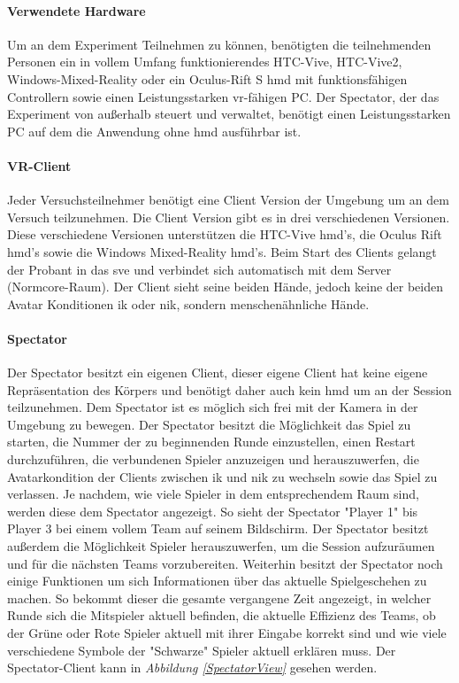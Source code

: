 \documentclass[a4paper,11pt]{article}%
\renewcommand{\\}{\vspace*{0.5\baselineskip} \newline}
\begin{document}
\paragraph{Verwendete Hardware}
Um an dem Experiment Teilnehmen zu können, benötigten die teilnehmenden Personen ein in vollem Umfang funktionierendes HTC-Vive, HTC-Vive2, Windows-Mixed-Reality oder ein Oculus-Rift S \ac{hmd} mit funktionsfähigen Controllern sowie einen Leistungsstarken \ac{vr}-fähigen PC. Der Spectator, der das Experiment von außerhalb steuert und verwaltet, benötigt einen Leistungsstarken PC auf dem die Anwendung ohne \ac{hmd} ausführbar ist.

\paragraph{VR-Client}
Jeder Versuchsteilnehmer benötigt eine Client Version der Umgebung um an dem Versuch teilzunehmen. Die Client Version gibt es in drei verschiedenen Versionen. Diese verschiedene Versionen unterstützen die HTC-Vive \ac{hmd}'s, die Oculus Rift \ac{hmd}'s sowie die Windows Mixed-Reality \ac{hmd}'s. Beim Start des Clients gelangt der Probant in das \ac{sve} und verbindet sich automatisch mit dem Server (Normcore-Raum).
Der Client sieht seine beiden Hände, jedoch keine der beiden Avatar Konditionen \ac{ik} oder \ac{nik}, sondern menschenähnliche Hände.

\paragraph{Spectator}
Der Spectator besitzt ein eigenen Client, dieser eigene Client hat keine eigene Repräsentation des Körpers und benötigt daher auch kein \ac{hmd} um an der Session teilzunehmen. Dem Spectator ist es möglich sich frei mit der Kamera in der Umgebung zu bewegen.
Der Spectator besitzt die Möglichkeit das Spiel zu starten, die Nummer der zu beginnenden Runde einzustellen, einen Restart durchzuführen, die verbundenen Spieler anzuzeigen und herauszuwerfen, die Avatarkondition der Clients zwischen \ac{ik} und \ac{nik} zu wechseln sowie das Spiel zu verlassen.
Je nachdem, wie viele Spieler in dem entsprechendem Raum sind, werden diese dem Spectator angezeigt. So sieht der Spectator "Player 1" bis \dq{}Player 3\dq{} bei einem vollem Team auf seinem Bildschirm. Der Spectator besitzt außerdem die Möglichkeit Spieler herauszuwerfen, um die Session aufzuräumen und für die nächsten Teams vorzubereiten.
Weiterhin besitzt der Spectator noch einige Funktionen um sich Informationen über das aktuelle Spielgeschehen zu machen. So bekommt dieser die gesamte vergangene Zeit angezeigt, in welcher Runde sich die Mitspieler aktuell befinden, die aktuelle Effizienz des Teams, ob der \dq{}Grüne\dq{} oder \dq{}Rote\dq{} Spieler aktuell mit ihrer Eingabe korrekt sind und wie viele verschiedene Symbole der "Schwarze" Spieler aktuell erklären muss. Der Spectator-Client kann in \textit{Abbildung \ref{SpectatorView}}  gesehen werden.
\end{document}
